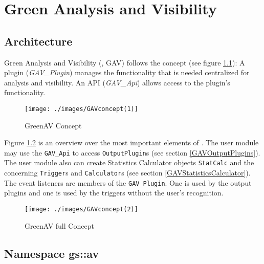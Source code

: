 


\cleardoublepage

\chapter{Green Analysis and Visibility}
\label{GreenAV}


\section{Architecture}
\label{Architecture}

Green Analysis and Visibility (\GreenAV, GAV) follows the \GreenControl concept (see figure \ref{fig:GAVConcept1}): A plugin ({\em GAV\_Plugin}) manages the functionality that is needed centralized for analysis and visibility. An API ({\em GAV\_Api}) allows access to the plugin's functionality.

\begin{figure}[ht]
	\centerline{
		\texttt{[image: ./images/GAVconcept(1)]}}
	\caption{GreenAV Concept}
	\label{fig:GAVConcept1}
\end{figure}

Figure \ref{fig:GAVConcept2} is an overview over the most important elements of \GreenAV. The user module may use the \lstinline|GAV_Api| to access \lstinline|OutputPlugin|s (see section \ref{GAVOutputPlugins}). The user module also can create Statistics Calculator objects \lstinline|StatCalc| and the concerning \lstinline|Trigger|s and \lstinline|Calculator|s (see section \ref{GAVStatisticsCalculator}). The event listeners are members of the \lstinline|GAV_Plugin|. One is used by the output plugins and one is used by the triggers without the user's recognition.

\begin{figure}[ht]
	\centerline{
		\texttt{[image: ./images/GAVconcept(2)]}}
	\caption{GreenAV full Concept}
	\label{fig:GAVConcept2}
\end{figure}


\section{Namespace gs::av}
\label{GAVnamespace}

